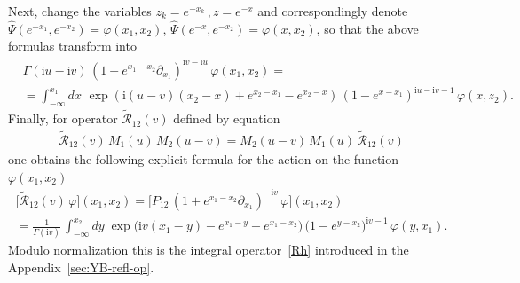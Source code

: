 \documentclass[11pt]{article}
\numberwithin{equation}{section}
\theoremstyle{plain}
\theoremstyle{definition}
\def\dd{\partial}
\renewcommand{\phi}{\varphi}
\renewcommand{\imath}{\mathrm{i}}
\begin{document}
Next, change the variables $z_k = e^{-x_k}\,,z=e^{-x}$ and correspondingly denote $\hat{\Psi}(e^{-x_1}, e^{-x_2}) = \phi(x_1, x_2)$, $\hat{\Psi}(e^{-x}, e^{-x_2}) = \phi(x, x_2)$,
so that the above formulas transform into
\begin{align*}
	&\Gamma(\imath u-\imath v)\,(1+e^{x_1-x_2} \dd_{x_1})^{\imath v-\imath u}\,\phi(x_1 , x_2) = 
	\\[6pt] 
	& = 
	\int_{-\infty}^{x_1} d x \, 
	\,\exp\left(\imath(u-v)(x_2-x)+e^{x_2-x_1}-e^{x_2-x}\right)\,
	\left(1-e^{x-x_1}\right)^{\imath u-\imath v-1}\,\phi(x, z_2).
\end{align*}
Finally, for operator $\widetilde{\mathcal{R}}_{12}(v)$ defined by equation
\begin{align}\label{RMM-2}
	\widetilde{\mathcal{R}}_{12}(v) \, M_1(u) \, M_2(u - v) = M_2(u - v) \, M_1(u) \, \widetilde{\mathcal{R}}_{12}(v)
\end{align}
one obtains the following explicit formula for the 
action on the function $\phi(x_1, x_2)$
\begin{multline}\label{Rh-2}
	\bigl[ \widetilde{\mathcal{R}}_{12} (v)\, \phi \bigr](x_1, x_2) = 
	\bigl[P_{12}\,(1+e^{x_1-x_2} \dd_{x_1})^{-\imath v}\,\phi \bigr](x_1 , x_2) \\[6pt]
	= \frac{1}{\Gamma(\imath v)}\,
	\int_{-\infty}^{x_2} dy \;\exp \bigl( \imath v(x_1 - y) - e^{x_1 - y} + e^{x_1 - x_2} \bigr) \, \bigl(1 - e^{y- x_2} \bigr)^{\imath v - 1} \,  \phi(y, x_1).
\end{multline}
Modulo normalization this is the integral operator~\eqref{Rh} introduced in the Appendix~\ref{sec:YB-refl-op}.
\end{document}
